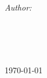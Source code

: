\begin{titlepage}
  \shortdate %
  \center %

  ~\\[2cm]
  \textsc{\LARGE \MetaInstitute}\\[1.5cm] %
  \textsc{\Large \MetaUnit}\\[0.5cm] %
  \textsc{\large \MetaTask}\\[2cm] %

  \HRule \\[0.5cm]
  {
    \LARGE \bfseries \MetaTitle \\[0.50cm] %
    \par
  }
  \HRule \\[1.5cm]

  \begin{minipage}{0.4\textwidth}
    \begin{flushleft}
      \large
        \emph{Author:}\\
        \MetaAuthorName~\textsc{\MetaAuthorSurname}\\
      \small \MetaStudentNumber
    \end{flushleft}
  \end{minipage}
  ~
  \begin{minipage}{0.4\textwidth}
    \begin{flushright}

    \end{flushright}
  \end{minipage}\\[4cm]

  \vspace*{\fill}
  {
    \large \today
  }
\end{titlepage}
